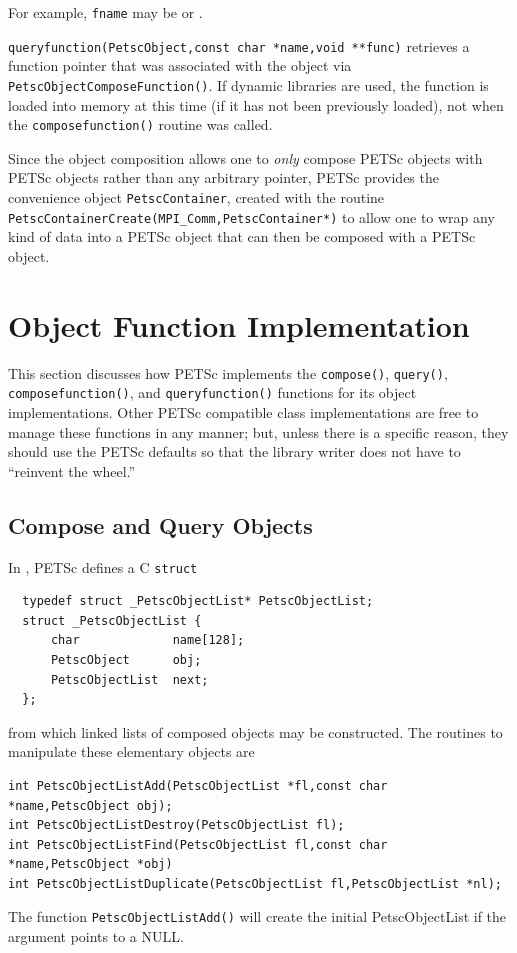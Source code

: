 \begin{tightitemize}
      For example, \lstinline{fname} may be  or
      .

\item \lstinline{queryfunction(PetscObject,const char *name,void **func)} retrieves a function pointer that
      was associated with the object via \lstinline{PetscObjectComposeFunction()}. If dynamic libraries are used, the function is loaded
      into memory at this time (if it has not been previously loaded), not when the
      \lstinline{composefunction()} routine was called.

\end{tightitemize}

Since the object composition allows one to {\em only} compose PETSc objects
with PETSc objects rather than any arbitrary pointer, PETSc provides
the convenience object \lstinline{PetscContainer}, created with the
routine \lstinline{PetscContainerCreate(MPI_Comm,PetscContainer*)}
to allow one to wrap any kind of data into a PETSc object that can then be
composed with a PETSc object.

\section{Object Function Implementation}

This section discusses how PETSc implements the \lstinline{compose()}, \lstinline{query()},
\lstinline{composefunction()}, and \lstinline{queryfunction()} functions for its object implementations.
Other PETSc compatible class implementations are free to manage these functions in any
manner; but, unless there is a specific reason, they should use the PETSc defaults so that the library writer does
not have to ``reinvent the wheel.''

\subsection{Compose and Query Objects}
In \href{http://www.mcs.anl.gov/petsc/petsc-master/src/objects/olist.c.html}{}, PETSc defines a C \lstinline{struct}
\begin{lstlisting}
  typedef struct _PetscObjectList* PetscObjectList;
  struct _PetscObjectList {
      char             name[128];
      PetscObject      obj;
      PetscObjectList  next;
  };
\end{lstlisting}
from which linked lists of composed objects may be constructed. The routines
to manipulate these elementary objects are
\begin{lstlisting}
int PetscObjectListAdd(PetscObjectList *fl,const char *name,PetscObject obj);
int PetscObjectListDestroy(PetscObjectList fl);
int PetscObjectListFind(PetscObjectList fl,const char *name,PetscObject *obj)
int PetscObjectListDuplicate(PetscObjectList fl,PetscObjectList *nl);
\end{lstlisting}
The function \lstinline{PetscObjectListAdd()} will create the initial PetscObjectList if the argument
 points to a NULL.

